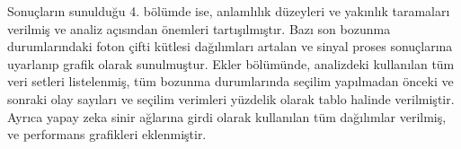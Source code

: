 Sonuçların sunulduğu 4. bölümde ise, anlamlılık düzeyleri ve yakınlık taramaları verilmiş ve analiz açısından önemleri tartışılmıştır. Bazı son bozunma durumlarındaki foton çifti kütlesi dağılımları artalan ve sinyal proses sonuçlarına uyarlanıp grafik olarak sunulmuştur. Ekler bölümünde, analizdeki kullanılan tüm veri setleri listelenmiş, tüm bozunma durumlarında seçilim yapılmadan önceki ve sonraki olay sayıları ve seçilim verimleri yüzdelik olarak tablo halinde verilmiştir. Ayrıca yapay zeka sinir ağlarına girdi olarak kullanılan tüm dağılımlar verilmiş, ve performans grafikleri eklenmiştir.
